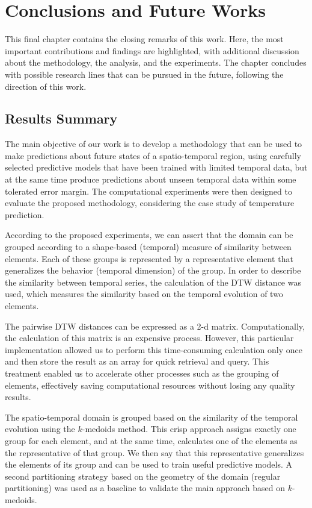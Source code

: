 \chapter{Conclusions and Future Works}
\label{chapter_Conclusions}

This final chapter contains the closing remarks of this work. Here, the most important contributions and findings are highlighted, with additional discussion about the methodology, the analysis, and the experiments. The chapter concludes with possible research lines that can be pursued in the future, following the direction of this work.
	
\section{Results Summary}
\label{Sec:ResultsSummary}

The main objective of our work is to develop a methodology that can be used to make predictions about future states of a spatio-temporal region, using carefully selected predictive models that have been trained with limited temporal data, but at the same time produce predictions about unseen temporal data within some tolerated error margin. The computational experiments were then designed to evaluate the proposed methodology, considering the case study of temperature prediction.

According to the proposed experiments, we can assert that the domain can be grouped according to a shape-based (temporal) measure of similarity between elements. Each of these groups is represented by a representative element that generalizes the behavior (temporal dimension) of the group. In order to describe the similarity between temporal series, the calculation of the DTW distance was used, which measures the similarity based on the temporal evolution of two elements.

The pairwise DTW distances can be expressed as a 2-d matrix. Computationally, the calculation of this matrix is an expensive process. However, this particular implementation allowed us to perform this time-consuming calculation only once and then store the result as an array for quick retrieval and query. This treatment enabled us to accelerate other processes such as the grouping of elements, effectively saving computational resources without losing any quality results.

The spatio-temporal domain is grouped based on the similarity of the temporal evolution using the $k$-medoids method. This crisp approach assigns exactly one group for each element, and at the same time, calculates one of the elements as the representative of that group. We then say that this representative generalizes the elements of its group and can be used to train useful predictive models. A second partitioning strategy based on the geometry of the domain (regular partitioning) was used as a baseline to validate the main approach based on $k$-medoids.

